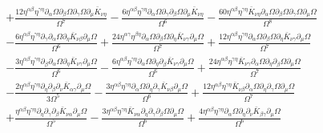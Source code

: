 \documentclass[10pt,letterpaper]{article}
\begin{document}
\begin{align}
&+ \frac{12 \eta^{\alpha \beta} \eta^{\gamma \eta} \partial_{\alpha}\Omega \partial_{\beta}\Omega \partial_{\gamma}\Omega \partial_{\mu}\bar{K}_{\nu \eta}}{\Omega^7} -  \frac{6 \eta^{\alpha \beta} \eta^{\gamma \eta} \partial_{\alpha}\Omega \partial_{\gamma}\partial_{\beta}\Omega \partial_{\mu}\bar{K}_{\nu \eta}}{\Omega^6} -  \frac{60 \eta^{\alpha \beta} \eta^{\gamma \eta} \bar{K}_{\nu \eta} \partial_{\alpha}\Omega \partial_{\beta}\Omega \partial_{\gamma}\Omega \partial_{\mu}\Omega}{\Omega^8}\nonumber \\
& -  \frac{6 \eta^{\alpha \beta} \eta^{\gamma \eta} \partial_{\gamma}\partial_{\alpha}\Omega \partial_{\eta}\bar{K}_{\nu \beta} \partial_{\mu}\Omega}{\Omega^6} + \frac{24 \eta^{\alpha \gamma} \eta^{\beta \eta} \partial_{\alpha}\Omega \partial_{\beta}\Omega \partial_{\eta}\bar{K}_{\nu \gamma} \partial_{\mu}\Omega}{\Omega^7} + \frac{12 \eta^{\alpha \beta} \eta^{\gamma \eta} \partial_{\alpha}\Omega \partial_{\beta}\Omega \partial_{\eta}\bar{K}_{\nu \gamma} \partial_{\mu}\Omega}{\Omega^7}\nonumber \\
& -  \frac{3 \eta^{\alpha \beta} \eta^{\gamma \eta} \partial_{\beta}\partial_{\alpha}\Omega \partial_{\eta}\bar{K}_{\nu \gamma} \partial_{\mu}\Omega}{\Omega^6} -  \frac{6 \eta^{\alpha \beta} \eta^{\gamma \eta} \partial_{\alpha}\Omega \partial_{\eta}\partial_{\beta}\bar{K}_{\nu \gamma} \partial_{\mu}\Omega}{\Omega^6} + \frac{24 \eta^{\alpha \beta} \eta^{\gamma \eta} \bar{K}_{\nu \gamma} \partial_{\alpha}\Omega \partial_{\eta}\partial_{\beta}\Omega \partial_{\mu}\Omega}{\Omega^7} \nonumber \\
&-  \frac{2 \eta^{\alpha \beta} \eta^{\gamma \eta} \partial_{\eta}\partial_{\beta}\partial_{\nu}\bar{K}_{\alpha \gamma} \partial_{\mu}\Omega}{3 \Omega^5} -  \frac{3 \eta^{\alpha \beta} \eta^{\gamma \eta} \partial_{\alpha}\Omega \partial_{\eta}\partial_{\gamma}\bar{K}_{\nu \beta} \partial_{\mu}\Omega}{\Omega^6} + \frac{12 \eta^{\alpha \beta} \eta^{\gamma \eta} \bar{K}_{\nu \beta} \partial_{\alpha}\Omega \partial_{\eta}\partial_{\gamma}\Omega \partial_{\mu}\Omega}{\Omega^7} \nonumber \\
&+ \frac{\eta^{\alpha \beta} \eta^{\gamma \eta} \partial_{\eta}\partial_{\gamma}\partial_{\beta}\bar{K}_{\nu \alpha} \partial_{\mu}\Omega}{\Omega^5} -  \frac{3 \eta^{\alpha \beta} \eta^{\gamma \eta} \bar{K}_{\nu \alpha} \partial_{\eta}\partial_{\gamma}\partial_{\beta}\Omega \partial_{\mu}\Omega}{\Omega^6} + \frac{4 \eta^{\alpha \beta} \eta^{\gamma \eta} \partial_{\alpha}\Omega \partial_{\eta}\partial_{\nu}\bar{K}_{\beta \gamma} \partial_{\mu}\Omega}{\Omega^6} \nonumber \\

\end{align}
\end{document}
